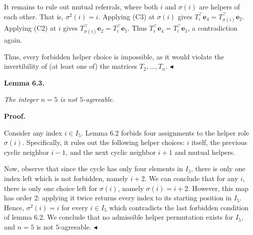 \documentclass[10pt,a4paper]{article}
\begin{document}
It remains to rule out mutual referrals, where both $i$ and $\sigma(i)$ are helpers of each other. That is, $\sigma^{2}(i)=i$. Applying (C3) at $\sigma(i)$ gives $T_{i}^{\top}\mathbf{e}_{4}=T_{\sigma(i)}^{\top}\mathbf{e}_{2}$. Applying (C2) at $i$ gives $T_{\sigma(i)}^{\top}\mathbf{e}_{2}=T_{i}^{\top}\mathbf{e}_{1}$. Thus $T_{i}^{\top}\mathbf{e}_{4}=T_{i}^{\top}\mathbf{e}_{1}$, a contradiction again.\par




Thus, every forbidden helper choice is impossible, as it would violate the invertibility of (at least one of) the matrices $T_{2},\ldots,T_{n}$.
$\blacktriangleleft$\par





\par\medskip\noindent\textbf{
\textbf{Lemma 6.3}\textbf{.}
}\par



\emph{The integer $n=5$ is not $5$-agreeable.}\par







\par\medskip\noindent\textbf{Proof.}\par




Consider any index $i\in I_{5}$. Lemma 6.2 forbids four assignments to the helper role $\sigma(i)$. Specifically, it rules out the following helper choices: $i$ itself, the previous cyclic neighbor $i-1$, and the next cyclic neighbor $i+1$ and mutual helpers.\par




Now, observe that since the cycle has only four elements in $I_{5}$, there is only one index left which is not forbidden, namely $i+2$.
We can conclude that for any $i$, there is only one choice left for $\sigma(i)$, namely $\sigma(i)=i+2$. However, this map has order 2: applying it twice returns every index to its starting position in $I_{5}$. Hence, $\sigma^{2}(i)=i$ for every $i\in I_{5}$ which contradicts the last forbidden condition of lemma 6.2.
We conclude that no admissible helper permutation exists for $I_{5}$, and $n=5$ is not $5$-agreeable.
$\blacktriangleleft$\par
\end{document}
